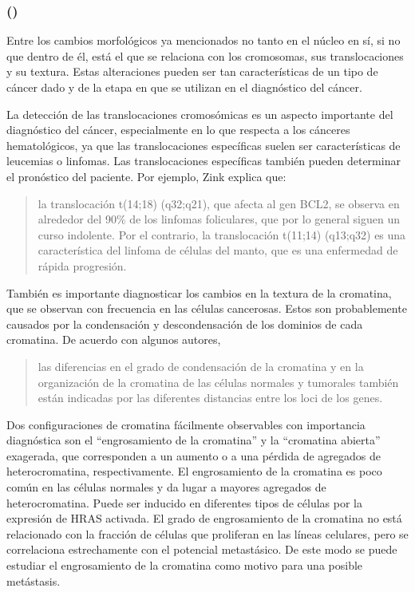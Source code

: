 \documentclass[12pt, letterpaper]{article}
\begin{document}
\newpage

\subsubsection{\texorpdfstring{ (\citeauthor{zinkNuclearStructureCancer2004})}{}}

Entre los cambios morfológicos ya mencionados no tanto en el núcleo en sí, si no que dentro de él, está el que se relaciona con los cromosomas, sus translocaciones y su textura. Estas alteraciones pueden ser tan características de un tipo de cáncer dado y de la etapa en que se utilizan en el diagnóstico del cáncer.


La detección de las translocaciones cromosómicas es un aspecto importante del diagnóstico del cáncer, especialmente en lo que respecta a los cánceres hematológicos, ya que las translocaciones específicas suelen ser características de leucemias o linfomas. Las translocaciones específicas también pueden determinar el pronóstico del paciente. Por ejemplo, Zink explica que:

\blockcquote[][p. 681]{zinkNuclearStructureCancer2004}{
la translocación t(14;18) (q32;q21), que afecta al gen BCL2, se observa en alrededor del 90\% de los linfomas foliculares, que por lo general siguen un curso indolente. Por el contrario, la translocación t(11;14) (q13;q32) es una característica del linfoma de células del manto, que es una enfermedad de rápida progresión.
}


También es importante diagnosticar los cambios en la textura de la cromatina, que se observan con frecuencia en las células cancerosas. Estos son probablemente causados por la condensación y descondensación de los dominios de cada cromatina. De acuerdo con algunos autores, \blockcquote{lukasovaTopographyGeneticLoci2004}{las diferencias en el grado de condensación de la cromatina y en la organización de la cromatina de las células normales y tumorales también están indicadas por las diferentes distancias entre los loci de los genes.
}

\pagebreak

Dos configuraciones de cromatina fácilmente observables con importancia diagnóstica son el \enquote{engrosamiento de la cromatina} y la \enquote{cromatina abierta} exagerada, que corresponden a un aumento o a una pérdida de agregados de heterocromatina, respectivamente. El engrosamiento de la cromatina es poco común en las células normales y da lugar a mayores agregados de heterocromatina. Puede ser inducido en diferentes tipos de células por la expresión de HRAS activada. El grado de engrosamiento de la cromatina no está relacionado con la fracción de células que proliferan en las líneas celulares, pero se correlaciona estrechamente con el potencial metastásico. De este modo se puede estudiar el engrosamiento de la cromatina como motivo para una posible metástasis.
\end{document}
